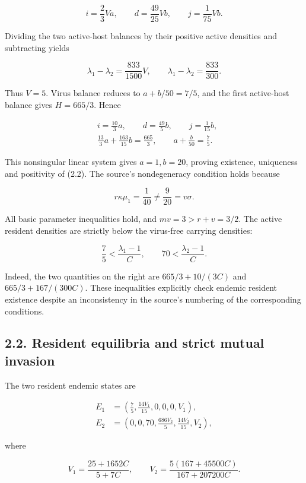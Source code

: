 \documentclass[
  11pt,
]{article}
\begin{document}
\[
i=\frac23Va,\qquad d=\frac{49}{25}Vb,\qquad j=\frac1{75}Vb.
\]

Dividing the two active-host balances by their positive active densities
and subtracting yields

\[
\lambda_1-\lambda_2=\frac{833}{1500}V,
\qquad \lambda_1-\lambda_2=\frac{833}{300}.
\]

Thus \(V=5\). Virus balance reduces to \(a+b/50=7/5\), and the first
active-host balance gives \(H=665/3\). Hence

\[
\begin{aligned}
&i=\frac{10}{3}a,\qquad d=\frac{49}{5}b,\qquad j=\frac1{15}b,\\
&\frac{13}{3}a+\frac{163}{15}b=\frac{665}{3},\qquad
a+\frac{b}{50}=\frac75.
\end{aligned}
\]

This nonsingular linear system gives \(a=1,b=20\), proving existence,
uniqueness and positivity of (2.2). The source's nondegeneracy condition
holds because

\[
r\kappa\mu_1=\frac1{40}\ne\frac9{20}=v\sigma.
\]

All basic parameter inequalities hold, and \(mv=3>r+v=3/2\). The active
resident densities are strictly below the virus-free carrying densities:

\[
\frac75<\frac{\lambda_1-1}{C},\qquad
70<\frac{\lambda_2-1}{C}.
\]

Indeed, the two quantities on the right are \(665/3+10/(3C)\) and
\(665/3+167/(300C)\). These inequalities explicitly check endemic
resident existence despite an inconsistency in the source's numbering of
the corresponding conditions.

\subsection{2.2. Resident equilibria and strict mutual
invasion}\label{resident-equilibria-and-strict-mutual-invasion}

The two resident endemic states are

\[
\begin{aligned}
E_1&=\left(\frac75,\frac{14V_1}{15},0,0,0,V_1\right),\\
E_2&=\left(0,0,70,\frac{686V_2}{5},\frac{14V_2}{15},V_2\right),
\end{aligned} \tag{2.3}
\]

where

\[
V_1=\frac{25+1652C}{5+7C},\qquad
V_2=\frac{5(167+45500C)}{167+207200C}. \tag{2.4}
\]
\end{document}
